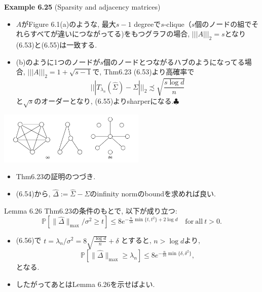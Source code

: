 \documentclass[unicode,aspectratio=169,11pt]{beamer}
\def\endexample{\hfill $\clubsuit$}
\newcommand{\bb}{\mathbb}
\begin{document}
\begin{frame}{}{}
  {\bf Example 6.25} (Sparsity and adjacency matrices)
  \begin{itemize}
    \item $A$がFigure 6.1(a)のような, 最大$s-1$ degreeで$s$-clique（$s$個のノードの組でそれらすべてが違いにつながってる)をもつグラフの場合, $|||A|||_2 = s$となり(6.53)と(6.55)は一致する.
    \item (b)のように1つのノードが$s$個のノードとつながるハブのようになってる場合, $|||A|||_2 = 1 + \sqrt{s - 1}$で, Thm6.23 (6.53)より高確率で
            \[ |||T_{\lambda_n}(\widehat{\Sigma}) - \Sigma|||_2 \precsim \sqrt{\frac{s\log d}{n}} \]
            と$\sqrt{s}$のオーダーとなり, (6.55)よりsharperになる.\endexample
  \end{itemize}
  \begin{center}
    \includegraphics[width=7cm]{figure_6_1.png}
  \end{center}
\end{frame}

\begin{frame}
  \begin{itemize}
    \item Thm6.23の証明のつづき.
    \item (6.54)から, $\widehat{\Delta} := \widehat{\Sigma} - \Sigma$のinfinity normのboundを求めれば良い.
  \end{itemize}
  \begin{block}{Lemma 6.26}
    Thm6.23の条件のもとで, 以下が成り立つ:
    \[
      \bb{P}[\| \widehat{\Delta} \|_{\max} / \sigma^2 \ge t]
      \le 8 e^{-\frac{n}{16}\min\{t, t^2\} + 2 \log d}
      \quad \mathrm{for\ all}\ t > 0.
      \tag{6.56}
    \]
  \end{block}
  \begin{itemize}
    \item (6.56)で $t = \lambda_n / \sigma^2 = 8\sqrt{\frac{\log d}{n}} + \delta$ とすると, $n > \log d$より,
          \[ \bb{P}[\|\widehat{\Delta}\|_{\max} \ge \lambda_n] \le 8e^{-\frac{n}{16}\min\{\delta, \delta^2\}}, \]
          となる.
    \item したがってあとはLemma 6.26を示せばよい.
  \end{itemize}
\end{frame}
\end{document}

